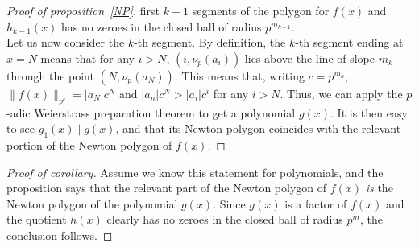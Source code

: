 \begin{proof}[Proof of proposition~\ref{NP}]
    first $k-1$ segments of the polygon for $f(x)$ and $h_{k-1}(x)$ has no zeroes in the closed ball
    of radius $p^{m_{k-1}}$.
    \\
    Let us now consider the $k$-th segment. By definition, the $k$-th segment ending at $x = N$
    means that for any $i > N$, $(i, \nu_p (a_i))$ lies above the line of slope $m_k$ through the
    point $(N, \nu_p (a_N))$. This means that, writing $c = p^{m_k}$, $\| f(x) \|_{p^{c}} =
    \lvert a_N \rvert c^N$ and $\lvert a_n \rvert c^N > \lvert a_i \rvert c^i $ for any $i > N$.
    Thus, we can apply the $p$-adic Weierstrass preparation theorem to get a polynomial $g(x)$.
    It is then easy to see $g_1 (x) \mid g(x)$, and that its Newton polygon coincides with the
    relevant portion of the Newton polygon of $f(x).$
\end{proof}

\begin{proof}[Proof of corollary]
    Assume we know this statement for polynomials, and the proposition says that the relevant
    part of the Newton polygon of $f(x)$ \emph{is} the Newton polygon of the polynomial $g(x)$.
    Since $g(x)$ is a factor of $f(x)$ and the quotient $h(x)$ clearly has no zeroes in the closed
    ball of radius $p^m$, the conclusion follows.
\end{proof}
